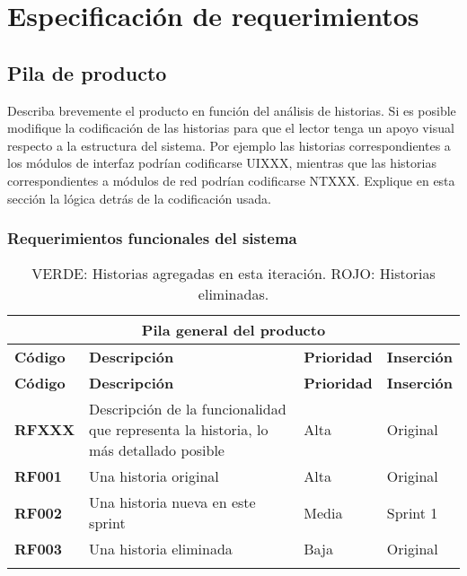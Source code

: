 \chapter{Especificación de requerimientos}
\section{Pila de producto}
Describa brevemente el producto en función del análisis de historias. Si es posible modifique la codificación de las historias para que el lector tenga un apoyo visual respecto a la estructura del sistema. Por ejemplo las historias correspondientes a los módulos de interfaz podrían codificarse UIXXX, mientras que las historias correspondientes a módulos de red podrían codificarse NTXXX. Explique en esta sección la lógica detrás de la codificación usada.

\subsection{Requerimientos funcionales del sistema}

\begin{longtable}{|l||p{7cm}|l|l|}

\multicolumn{4}{c}{Pila general del producto}\\
\hline\hline
\textbf{Código} & \textbf{Descripción} & \textbf{Prioridad} & \textbf{Inserción}\\
\hline
\endfirsthead
\textbf{Código} & \textbf{Descripción} & \textbf{Prioridad} & \textbf{Inserción}\\
\hline\hline
\endhead

\textbf{RFXXX} & 
Descripción de la funcionalidad que representa la historia, lo más detallado posible & Alta & Original\\

\textbf{RF001} & Una historia original & Alta & Original \\

\color{ForestGreen}
\textbf{RF002} & Una historia nueva en este sprint & Media & Sprint 1 \\

\color{Mahogany}
\textbf{RF003} & Una historia eliminada & Baja & Original \\
\hline

\caption{\color{ForestGreen}VERDE: Historias agregadas en esta iteración. \color{Mahogany}ROJO: Historias eliminadas.}
\label{ProductBacklog}

\end{longtable}

